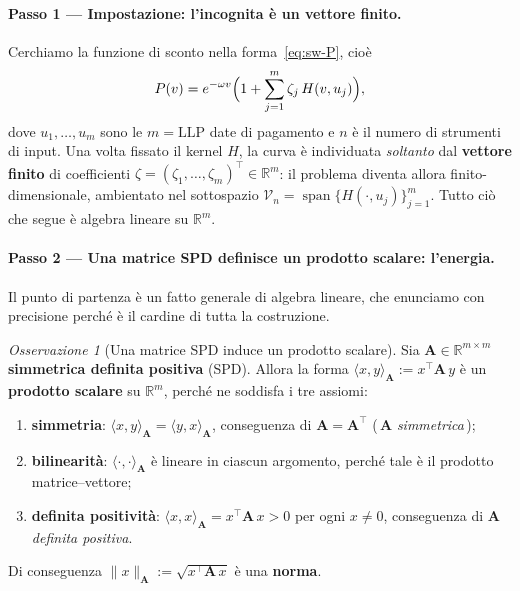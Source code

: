 \documentclass[11pt,a4paper]{article}
\theoremstyle{plain}
\theoremstyle{definition}
\theoremstyle{remark}
\newtheorem*{osservazione}{Osservazione}
\newcommand{\LLP}{\ensuremath{\mathrm{LLP}}}
\newcommand{\transp}{^{\!\top}}
\begin{document}
\paragraph{Passo 1 --- Impostazione: l'incognita \`e un vettore finito.}
Cerchiamo la funzione di sconto nella forma~\eqref{eq:sw-P}, cio\`e
\[
  P(v) = e^{-\omega v}\Bigl(1 + \sum_{j=1}^{m}\zeta_j\,H(v,u_j)\Bigr),
\]
dove $u_1,\dots,u_m$ sono le $m=\LLP$ date di pagamento e $n$ \`e il numero di strumenti di
input. Una volta fissato il kernel $H$, la curva \`e individuata \emph{soltanto} dal
\textbf{vettore finito} di coefficienti $\zeta = (\zeta_1,\dots,\zeta_m)\transp \in
\mathbb{R}^m$: il problema diventa allora finito-dimensionale, ambientato nel sottospazio
$\mathcal{V}_n = \operatorname{span}\{H(\cdot,u_j)\}_{j=1}^{m}$. Tutto ci\`o che segue \`e
algebra lineare su $\mathbb{R}^m$.

\paragraph{Passo 2 --- Una matrice SPD definisce un prodotto scalare: l'energia.}
Il punto di partenza \`e un fatto generale di algebra lineare, che enunciamo con
precisione perch\'e \`e il cardine di tutta la costruzione.

\begin{osservazione}[Una matrice SPD induce un prodotto scalare]
\label{oss:spd-prodotto}
Sia $\mathbf{A}\in\mathbb{R}^{m\times m}$ \textbf{simmetrica definita positiva} (SPD).
Allora la forma $\langle x,y\rangle_{\mathbf{A}} := x\transp \mathbf{A}\, y$ \`e un
\textbf{prodotto scalare} su $\mathbb{R}^m$, perch\'e ne soddisfa i tre assiomi:
\begin{enumerate}
  \item \textbf{simmetria}: $\langle x,y\rangle_{\mathbf{A}} = \langle y,x\rangle_{\mathbf{A}}$,
        conseguenza di $\mathbf{A} = \mathbf{A}\transp$ (\,$\mathbf{A}$ \emph{simmetrica}\,);
  \item \textbf{bilinearit\`a}: $\langle \cdot,\cdot\rangle_{\mathbf{A}}$ \`e lineare in
        ciascun argomento, perch\'e tale \`e il prodotto matrice--vettore;
  \item \textbf{definita positivit\`a}: $\langle x,x\rangle_{\mathbf{A}} = x\transp\mathbf{A}\,x > 0$
        per ogni $x\neq 0$, conseguenza di $\mathbf{A}$ \emph{definita positiva}.
\end{enumerate}
Di conseguenza $\|x\|_{\mathbf{A}} := \sqrt{x\transp \mathbf{A}\, x}$ \`e una \textbf{norma}.
\end{osservazione}
\end{document}
